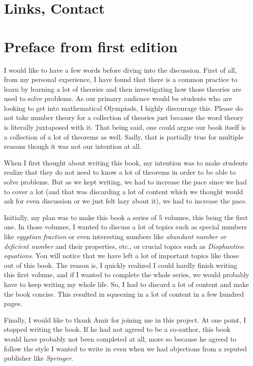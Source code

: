 \documentclass[leqno,12pt]{book}
\begin{document}
\section*{Links, Contact}


\newpage
\section*{Preface from first edition}

I would like to have a few words before diving into the discussion. First of all, from my personal experience, I have found that there is a common practice to learn by learning a lot of theories and then investigating how those theories are used to solve problems. As our primary audience would be students who are looking to get into mathematical Olympiads, I highly discourage this. Please do not take number theory for a collection of theories just because the word theory is literally juxtaposed with it. That being said, one could argue our book itself is a collection of a lot of theorems as well. Sadly, that is partially true for multiple reasons though it was not our intention at all.


When I first thought about writing this book, my intention was to make students realize that they do not need to know a lot of theorems in order to be able to solve problems. But as we kept writing, we had to increase the pace since we had to cover a lot (and that was discarding a lot of content which we thought would ask for even discussion or we just felt lazy about it), we had to increase the pace.


Initially, my plan was to make this book a series of $5$ volumes, this being the first one. In those volumes, I wanted to discuss a lot of topics such as special numbers like \textit{egyptian fraction} or even interesting numbers like \textit{abundant number or deficient number} and their properties, etc., or crucial topics such as \textit{Diophantine equations}. You will notice that we have left a lot of important topics like those out of this book. The reason is, I quickly realized I could hardly finish writing this first volume, and if I wanted to complete the whole series, we would probably have to keep writing my whole life. So, I had to discard a lot of content and make the book concise. This resulted in squeezing in a lot of content in a few hundred pages.


Finally, I would like to thank Amir for joining me in this project. At one point, I stopped writing the book. If he had not agreed to be a co-author, this book would have probably not been completed at all, more so because he agreed to follow the style I wanted to write in even when we had objections from a reputed publisher like \textit{Springer}.
\end{document}
